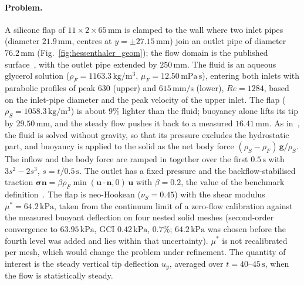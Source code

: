 \paragraph{Problem.}
A silicone flap of $11 \times 2 \times 65\,\mathrm{mm}$ is clamped to the wall where two inlet pipes (diameter $21.9\,\mathrm{mm}$, centres at $y = \pm27.15\,\mathrm{mm}$) join an outlet pipe of diameter $76.2\,\mathrm{mm}$ (Fig.~\ref{fig:hessenthaler_geom}); the flow domain is the published surface~\citep{Hessenthaler2017a}, with the outlet pipe extended by $250\,\mathrm{mm}$.
The fluid is an aqueous glycerol solution ($\rho_F = 1163.3\,\mathrm{kg/m^3}$, $\mu_F = 12.50\,\mathrm{mPa\,s}$), entering both inlets with parabolic profiles of peak $630$ (upper) and $615\,\mathrm{mm/s}$ (lower), $Re = 1284$, based on the inlet-pipe diameter and the peak velocity of the upper inlet.
The flap ($\rho_S = 1058.3\,\mathrm{kg/m^3}$) is about $9\%$ lighter than the fluid; buoyancy alone lifts its tip by $29.50\,\mathrm{mm}$, and the steady flow pushes it back to a measured $16.41\,\mathrm{mm}$.
As in~\citep{Hessenthaler2017b}, the fluid is solved without gravity, so that its pressure excludes the hydrostatic part, and buoyancy is applied to the solid as the net body force $(\rho_S - \rho_F)\,\mathbf{g}/\rho_S$. The inflow and the body force are ramped in together over the first $0.5\,\mathrm{s}$ with $3s^2 - 2s^3$, $s = t/0.5\,\mathrm{s}$.
The outlet has a fixed pressure and the backflow-stabilised traction $\boldsymbol{\sigma}\mathbf{n} = \beta \rho_F \min(\mathbf{u}\cdot\mathbf{n}, 0)\,\mathbf{u}$ with $\beta = 0.2$, the value of the benchmark definition~\citep{Hessenthaler2017b,EsmailyMoghadam2011}.
The flap is neo-Hookean ($\nu_S = 0.45$) with the shear modulus $\mu^* = 64.2\,\mathrm{kPa}$, taken from the continuum limit of a zero-flow calibration against the measured buoyant deflection on four nested solid meshes (second-order convergence to $63.95\,\mathrm{kPa}$, GCI $0.42\,\mathrm{kPa}$, $0.7\%$; $64.2\,\mathrm{kPa}$ was chosen before the fourth level was added and lies within that uncertainty). $\mu^*$ is not recalibrated per mesh, which would change the problem under refinement.
The quantity of interest is the steady vertical tip deflection $u_y$, averaged over $t = 40$--$45\,\mathrm{s}$, when the flow is statistically steady.


